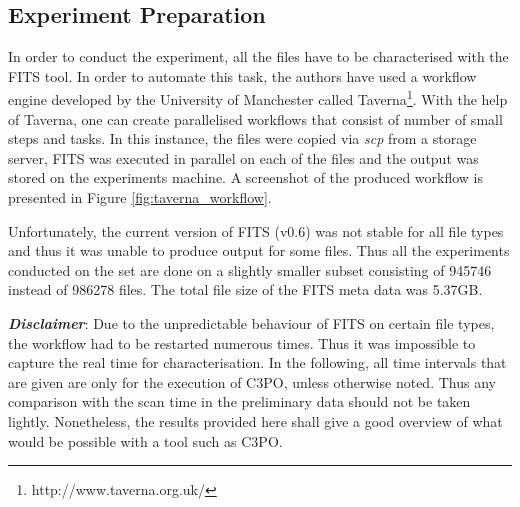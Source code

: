 \subsection{Experiment Preparation}
In order to conduct the experiment, all the files have to be characterised with the FITS tool.
In order to automate this task, the authors have used a workflow engine developed by the University of Manchester called Taverna\footnote{http://www.taverna.org.uk/}.
With the help of Taverna, one can create parallelised workflows that consist of number of small steps and tasks.
In this instance, the files were copied via \textit{scp} from a storage server, FITS was executed in parallel on each of the files and the output was stored on the experiments machine. A screenshot of the produced workflow is presented in Figure \ref{fig:taverna_workflow}.

Unfortunately, the current version of FITS (v0.6) was not stable for all file types and thus it was unable to produce output for some files.
Thus all the experiments conducted on the set are done on a slightly smaller subset consisting of 945746 instead of 986278 files. The total file size of the FITS meta data was 5.37GB.

\textbf{\textit{Disclaimer}}: Due to the unpredictable behaviour of FITS on certain file types, the workflow had to be restarted numerous times.
Thus it was impossible to capture the real time for characterisation.
In the following, all time intervals that are given are only for the execution of C3PO, unless otherwise noted.
Thus any comparison with the scan time in the preliminary data should not be taken lightly.
Nonetheless, the results provided here shall give a good overview of what would be possible with a tool such as C3PO.

